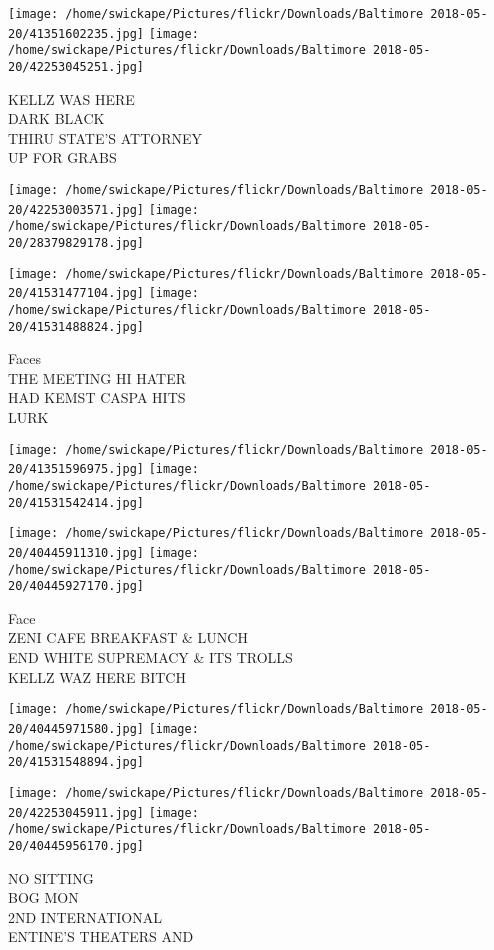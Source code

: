 \documentclass[10pt,letterpaper]{article}
\begin{document}
\texttt{[image: /home/swickape/Pictures/flickr/Downloads/Baltimore 2018-05-20/41351602235.jpg]}
\texttt{[image: /home/swickape/Pictures/flickr/Downloads/Baltimore 2018-05-20/42253045251.jpg]}

KELLZ WAS HERE\\
DARK BLACK\\
THIRU STATE'S ATTORNEY\\
UP FOR GRABS
\pagebreak

\texttt{[image: /home/swickape/Pictures/flickr/Downloads/Baltimore 2018-05-20/42253003571.jpg]}
\texttt{[image: /home/swickape/Pictures/flickr/Downloads/Baltimore 2018-05-20/28379829178.jpg]}

\texttt{[image: /home/swickape/Pictures/flickr/Downloads/Baltimore 2018-05-20/41531477104.jpg]}
\texttt{[image: /home/swickape/Pictures/flickr/Downloads/Baltimore 2018-05-20/41531488824.jpg]}

Faces\\
THE MEETING HI HATER\\
HAD KEMST CASPA HITS\\
LURK
\pagebreak

\texttt{[image: /home/swickape/Pictures/flickr/Downloads/Baltimore 2018-05-20/41351596975.jpg]}
\texttt{[image: /home/swickape/Pictures/flickr/Downloads/Baltimore 2018-05-20/41531542414.jpg]}

\texttt{[image: /home/swickape/Pictures/flickr/Downloads/Baltimore 2018-05-20/40445911310.jpg]}
\texttt{[image: /home/swickape/Pictures/flickr/Downloads/Baltimore 2018-05-20/40445927170.jpg]}

Face\\
ZENI CAFE BREAKFAST \& LUNCH\\
END WHITE SUPREMACY \& ITS TROLLS\\
KELLZ WAZ HERE BITCH
\pagebreak

\texttt{[image: /home/swickape/Pictures/flickr/Downloads/Baltimore 2018-05-20/40445971580.jpg]}
\texttt{[image: /home/swickape/Pictures/flickr/Downloads/Baltimore 2018-05-20/41531548894.jpg]}

\texttt{[image: /home/swickape/Pictures/flickr/Downloads/Baltimore 2018-05-20/42253045911.jpg]}
\texttt{[image: /home/swickape/Pictures/flickr/Downloads/Baltimore 2018-05-20/40445956170.jpg]}

NO SITTING\\
BOG MON\\
2ND INTERNATIONAL\\
ENTINE'S THEATERS AND
\pagebreak
\end{document}
